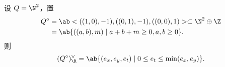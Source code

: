 \begin{exm}
    设 \(Q = \N^2\)，置
    \begin{align*}
        Q^{\circ} &= \ab<((1,0), -1), ((0,1), -1), ((0,0),1)> \subset \N^2 \oplus \Z \\
        &= \ab\{((a,b), m) \mid a+b+m \geq 0, a,b \geq 0 \}.
    \end{align*}
    则
    \[ (Q^{\circ})_{\R}^{\vee} = \ab\{ (e_x, e_y, e_t) \mid 0 \leq e_t \leq \min(e_x, e_y) \}. \]
\end{exm}






